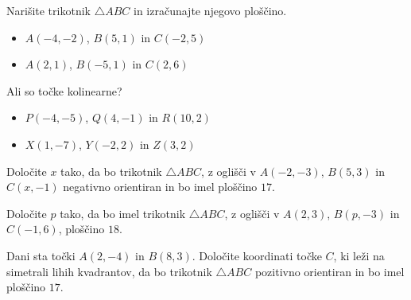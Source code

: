         \begin{naloga}
            Narišite trikotnik $\triangle ABC$ in izračunajte njegovo ploščino.
            \begin{itemize}
                \item $A(-4,-2)$, $B(5,1)$ in $C(-2,5)$ 
                \item $A(2,1)$, $B(-5,1)$ in $C(2,6)$ 
            \end{itemize}
        \end{naloga}

        \begin{naloga}
            Ali so točke kolinearne?
            \begin{itemize}
                \item $P(-4,-5)$, $Q(4,-1)$ in $R(10,2)$ 
                \item $X(1,-7)$, $Y(-2,2)$ in $Z(3,2)$ 
            \end{itemize}
        \end{naloga}

        \begin{naloga}
            Določite $x$ tako, da bo trikotnik $\triangle ABC$, z oglišči v $A(-2,-3)$, $B(5,3)$ in $C(x,-1)$ negativno orientiran 
            in bo imel ploščino $17$. 
        \end{naloga}
       
        \begin{naloga}
            Določite $p$ tako, da bo imel trikotnik $\triangle ABC$, z oglišči v $A(2,3)$, $B(p,-3)$ in $C(-1,6)$, ploščino $18$. 
        \end{naloga}

        \begin{naloga}
            Dani sta točki $A(2,-4)$ in $B(8,3)$. Določite koordinati točke $C$, ki leži na simetrali lihih kvadrantov, 
            da bo trikotnik $\triangle ABC$ pozitivno orientiran in bo imel ploščino $17$.
        \end{naloga}



